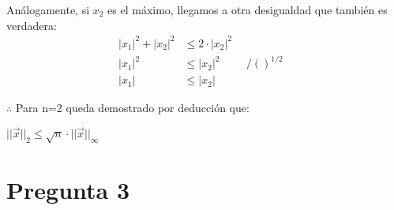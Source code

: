 \documentclass[spanish, fleqn]{article}
\begin{document}
Análogamente, si $x_2$ es el máximo, llegamos a otra desigualdad que también es verdadera:
\begin{align*}
|x_1|^2+|x_2|^2&\leq2\cdot |x_2|^2&\\
|x_1|^2&\leq|x_2|^2 \hspace{1cm}/()^{1/2}&\\
|x_1|&\leq|x_2|
\end{align*}

$\therefore$ Para n=2 queda demostrado por deducción que:

\hspace{0.4cm}$|| \vec{x} ||_2 \leq \sqrt{n} \cdot  || \vec{x} ||_{\infty}$

\section*{Pregunta 3}
\end{document}
